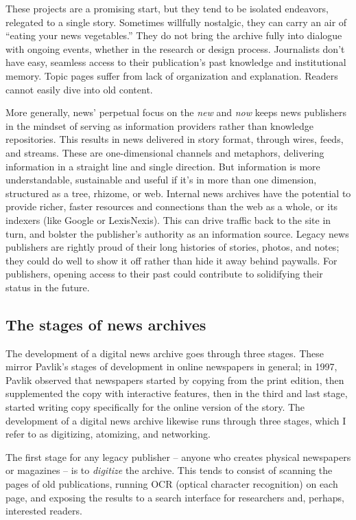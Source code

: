 These projects are a promising start, but they tend to be isolated endeavors, relegated to a single story. Sometimes willfully nostalgic, they can carry an air of ``eating your news vegetables.'' They do not bring the archive fully into dialogue with ongoing events, whether in the research or design process. Journalists don't have easy, seamless access to their publication's past knowledge and institutional memory. Topic pages suffer from lack of organization and explanation. Readers cannot easily dive into old content.

More generally, news' perpetual focus on the \emph{new} and \emph{now} keeps news publishers in the mindset of serving as information providers rather than knowledge repositories. This results in news delivered in story format, through wires, feeds, and streams. These are one-dimensional channels and metaphors, delivering information in a straight line and single direction. But information is more understandable, sustainable and useful if it's in more than one dimension, structured as a tree, rhizome, or web. Internal news archives have the potential to provide richer, faster resources and connections than the web as a whole, or its indexers (like Google or LexisNexis). This can drive traffic back to the site in turn, and bolster the publisher's authority as an information source. Legacy news publishers are rightly proud of their long histories of stories, photos, and notes; they could do well to show it off rather than hide it away behind paywalls. For publishers, opening access to their past could contribute to solidifying their status in the future.

\subsection{The stages of news archives}

The development of a digital news archive goes through three stages. These mirror Pavlik's stages of development in online newspapers in general; in 1997, Pavlik observed that newspapers started by copying from the print edition, then supplemented the copy with interactive features, then in the third and last stage, started writing copy specifically for the online version of the story. The development of a digital news archive likewise runs through three stages, which I refer to as digitizing, atomizing, and networking.

The first stage for any legacy publisher -- anyone who creates physical newspapers or magazines -- is to \emph{digitize} the archive. This tends to consist of scanning the pages of old publications, running OCR (optical character recognition) on each page, and exposing the results to a search interface for researchers and, perhaps, interested readers.

